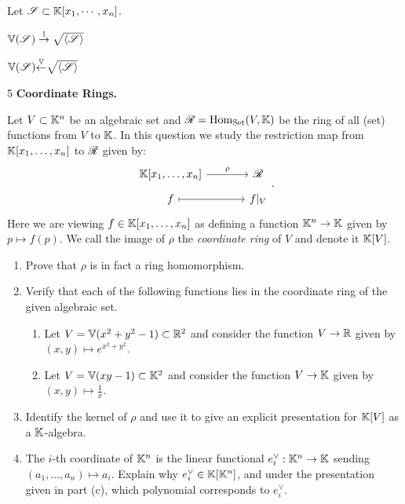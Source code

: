 \documentclass[Notebook.tex]{subfiles}
\begin{document}
\begin{solution}
    \bbni 

    Let $\operatorname{\mathscr S} \subset \mathbb K[x_1, \cdots, x_n]$. 

    $\mathbb V(\operatorname{\mathscr S}) \overset{\mathbb I}{\to} \sqrt{\langle \operatorname{\mathscr S} \rangle}$

    $\mathbb V(\operatorname{\mathscr S}) \overset{\mathbb V}{\operatorname{\leftarrow}} \sqrt{\langle \operatorname{\mathscr S} \rangle}$

\end{solution}

\newpage
 
\begin{problem}{5}
    \textbf{Coordinate Rings.} 
    
    Let $V \subset \mathbb K^n$ be an algebraic set and $\operatorname{\mathscr R} = \operatorname{Hom}_{\text{Set}}(V,\mathbb K)$ be the ring of all (set) functions from $V$ to $\mathbb K$. In this question we study the restriction map from $\mathbb K[x_1,\ldots,x_n]$ to $\operatorname{\mathscr R}$ given by:
    \[
    \begin{tikzcd}[column sep = 3.5em, row sep = .5em]
    \K[x_1,\ldots,x_n] \arrow[r, "\rho"] & \cR\\
    f \arrow[r, mapsto] & f|_{V}
    \end{tikzcd}.
    \]
    Here we are viewing $f \in \mathbb K[x_1,\ldots,x_n]$ as defining a function $\mathbb K^n \to \mathbb K$ given by $p \mapsto f(p)$. We call the image of $\rho$ the \emph{coordinate ring} of $V$ and denote it $\mathbb K[V]$. 
    \begin{enumerate}[label=(\alph*),ref=\theenumi\alph*]
        \item Prove that $\rho$ is in fact a ring homomorphism. 
        \item Verify that each of the following functions lies in the coordinate ring of the given algebraic set. 
        \begin{enumerate}[label=(\roman*), ref=\theenumi\roman*]
            \item Let $V = \mathbb V(x^2+y^2-1) \subset \mathbb R^2$ and consider the function $V \to \mathbb R$ given by $(x,y)\mapsto e^{x^2+y^2}$.
            \item Let $V = \mathbb V(xy-1) \subset \mathbb K^{2}$ and consider the function $V\to \mathbb K$ given by $(x,y) \mapsto \frac{1}{x}$. 
        \end{enumerate}
        \item\label{ex-pt:cord-ring-as-quot} Identify the kernel of $\rho$ and use it to give an explicit presentation for $\mathbb K[V]$ as a $\mathbb K$-algebra.
        \item The $i$-th coordinate of $\mathbb K^n$ is the linear functional $e_i^\vee: \mathbb K^n \to \mathbb K$ sending $(a_1,\ldots,a_n) \mapsto a_i$. Explain why $e_i^{\vee} \in \mathbb K[\mathbb K^n]$, and under the presentation given in part (c),  which polynomial corresponds to $e_i^{\vee}$. 

\end{enumerate}
\end{problem}
\end{document}
